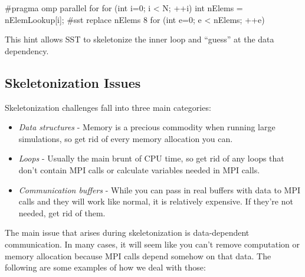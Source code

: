 \begin{CppCode}
#pragma omp parallel for
for (int i=0; i < N; ++i){
  int nElems = nElemLookup[i];
  #sst replace nElems 8
  for (int e=0; e < nElems; ++e){
  }
}
\end{CppCode}
This hint allows SST to skeletonize the inner loop and ``guess'' at the data dependency.



\subsection{Skeletonization Issues}
\label{subsec:skeletonIssues}

Skeletonization challenges fall into three main categories:

\begin{itemize}
\item \textit{Data structures} - Memory is a precious commodity when running large simulations, so get rid of every memory allocation you can.
\item \textit{Loops} - Usually the main brunt of CPU time, so get rid of any loops that don't contain MPI calls or calculate variables needed in MPI calls.
\item \textit{Communication buffers} - While you can pass in real buffers with data to \sstmacro MPI calls and they will work like normal, it is relatively expensive. If they're not needed, get rid of them.
\end{itemize}





The main issue that arises during skeletonization is data-dependent communication.  
In many cases, it will seem like you can't remove computation or memory allocation because MPI calls depend somehow on that data.  
The following are some examples of how we deal with those:

